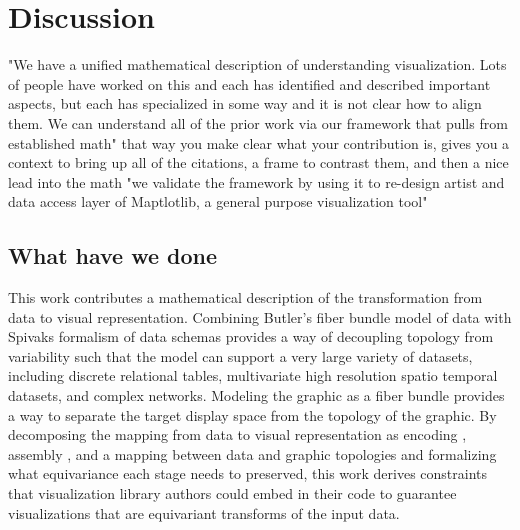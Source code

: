 \documentclass[../main.tex]{subfiles}
\begin{document}
\section{Discussion}

"We have a unified mathematical description of understanding visualization.  Lots of people have worked on this and each has identified and described important aspects, but each has specialized in some way and it is not clear how to align them.  We can understand all of the prior work via our framework that pulls from {established math}"
that way you make clear what your contribution is, gives you a context to bring up all of the citations, a frame to contrast them, and then a nice lead into the math
 "we validate the framework by using it to re-design artist and data access layer of Maptlotlib, a general purpose visualization tool"

\subsection{What have we done}
This work contributes a mathematical description of the transformation from data to visual representation. Combining Butler's fiber bundle model of data with Spivaks formalism of data schemas provides a way of decoupling topology from variability such that the model can support a very large variety of datasets, including discrete relational tables, multivariate high resolution spatio temporal datasets, and complex networks. Modeling the graphic as a fiber bundle provides a way to separate the target display space from the topology of the graphic. By decomposing the mapping from data to visual representation as encoding \vchannel, assembly \vmark, and a mapping between data and graphic topologies \vindex and formalizing what equivariance each stage needs to preserved, this work derives constraints that visualization library authors could embed in their code to guarantee visualizations that are equivariant transforms of the input data. 
\end{document}
